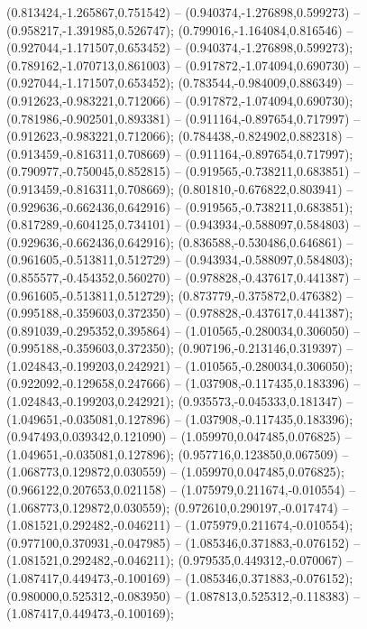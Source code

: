  (0.813424,-1.265867,0.751542) -- (0.940374,-1.276898,0.599273) -- (0.958217,-1.391985,0.526747);
 (0.799016,-1.164084,0.816546) -- (0.927044,-1.171507,0.653452) -- (0.940374,-1.276898,0.599273);
 (0.789162,-1.070713,0.861003) -- (0.917872,-1.074094,0.690730) -- (0.927044,-1.171507,0.653452);
 (0.783544,-0.984009,0.886349) -- (0.912623,-0.983221,0.712066) -- (0.917872,-1.074094,0.690730);
 (0.781986,-0.902501,0.893381) -- (0.911164,-0.897654,0.717997) -- (0.912623,-0.983221,0.712066);
 (0.784438,-0.824902,0.882318) -- (0.913459,-0.816311,0.708669) -- (0.911164,-0.897654,0.717997);
 (0.790977,-0.750045,0.852815) -- (0.919565,-0.738211,0.683851) -- (0.913459,-0.816311,0.708669);
 (0.801810,-0.676822,0.803941) -- (0.929636,-0.662436,0.642916) -- (0.919565,-0.738211,0.683851);
 (0.817289,-0.604125,0.734101) -- (0.943934,-0.588097,0.584803) -- (0.929636,-0.662436,0.642916);
 (0.836588,-0.530486,0.646861) -- (0.961605,-0.513811,0.512729) -- (0.943934,-0.588097,0.584803);
 (0.855577,-0.454352,0.560270) -- (0.978828,-0.437617,0.441387) -- (0.961605,-0.513811,0.512729);
 (0.873779,-0.375872,0.476382) -- (0.995188,-0.359603,0.372350) -- (0.978828,-0.437617,0.441387);
 (0.891039,-0.295352,0.395864) -- (1.010565,-0.280034,0.306050) -- (0.995188,-0.359603,0.372350);
 (0.907196,-0.213146,0.319397) -- (1.024843,-0.199203,0.242921) -- (1.010565,-0.280034,0.306050);
 (0.922092,-0.129658,0.247666) -- (1.037908,-0.117435,0.183396) -- (1.024843,-0.199203,0.242921);
 (0.935573,-0.045333,0.181347) -- (1.049651,-0.035081,0.127896) -- (1.037908,-0.117435,0.183396);
 (0.947493,0.039342,0.121090) -- (1.059970,0.047485,0.076825) -- (1.049651,-0.035081,0.127896);
 (0.957716,0.123850,0.067509) -- (1.068773,0.129872,0.030559) -- (1.059970,0.047485,0.076825);
 (0.966122,0.207653,0.021158) -- (1.075979,0.211674,-0.010554) -- (1.068773,0.129872,0.030559);
 (0.972610,0.290197,-0.017474) -- (1.081521,0.292482,-0.046211) -- (1.075979,0.211674,-0.010554);
 (0.977100,0.370931,-0.047985) -- (1.085346,0.371883,-0.076152) -- (1.081521,0.292482,-0.046211);
 (0.979535,0.449312,-0.070067) -- (1.087417,0.449473,-0.100169) -- (1.085346,0.371883,-0.076152);
 (0.980000,0.525312,-0.083950) -- (1.087813,0.525312,-0.118383) -- (1.087417,0.449473,-0.100169);
